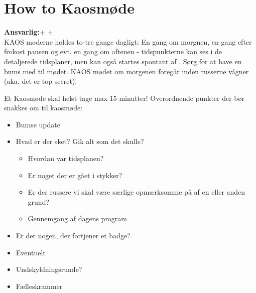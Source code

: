 \documentclass[../../main.tex]{subfiles}
\begin{document}
\section{How to Kaosmøde}
\textbf{Ansvarlig:}\DAGS + \ALLEV + \KABS\\

KAOS møderne holdes to-tre gange dagligt: En gang om morgnen, en gang efter frokost pausen og evt. en gang om aftenen - tidspunkterne kan ses i de detaljerede tidsplaner, men kan også startes spontant af \DAGS. Sørg for at have en bums med til mødet. KAOS mødet om morgenen foregår inden russerne vågner (aka. det er top secret). 

Et Kaosmøde skal helst tage max 15 minutter! Overordnende punkter der bør snakkes om til kaosmøde:
\begin{itemize}
\item Bumse update 
\item Hvad er der sket? Gik alt som det skulle?
\begin{itemize}
    \item Hvordan var tidsplanen?
    \item Er noget der er gået i stykker?
    \item Er der russere vi skal være særlige opmærksomme på af en eller anden grund?
    \item Gennemgang af dagens program
\end{itemize}
\item Er der nogen, der fortjener et badge?
\item Eventuelt
\item Undskyldningsrunde?
\item Fælleskrammer
\end{itemize}
\end{document}
